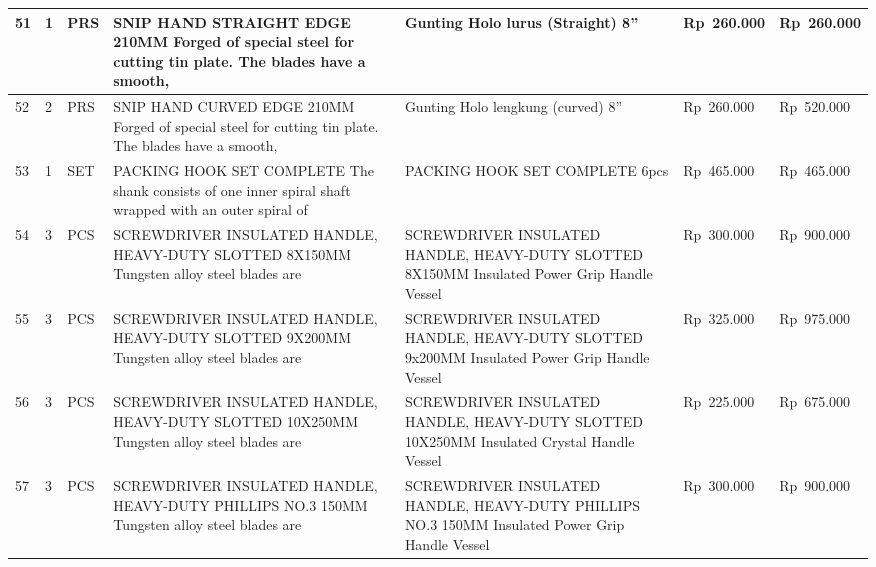 \documentclass[9pt,a4paper,landscape]{article}
\begin{document}
\begin{longtable}{|C{0.6cm}|C{0.6cm}|C{0.8cm}|L{8.0cm}|L{9.5cm}|R{2.5cm}|R{2.5cm}|}
51 & 1 & PRS &
  SNIP HAND STRAIGHT EDGE 210MM\newline
  Forged of special steel for cutting tin plate.\newline
  The blades have a smooth, &
  Gunting Holo lurus (Straight) 8'' &
  Rp~260.000 & Rp~260.000 \\
\hline

52 & 2 & PRS &
  SNIP HAND CURVED EDGE 210MM\newline
  Forged of special steel for cutting tin plate.\newline
  The blades have a smooth, &
  Gunting Holo lengkung (curved) 8'' &
  Rp~260.000 & Rp~520.000 \\
\hline

53 & 1 & SET &
  PACKING HOOK SET COMPLETE\newline
  The shank consists of one inner spiral shaft\newline
  wrapped with an outer spiral of &
  PACKING HOOK SET COMPLETE 6pcs &
  Rp~465.000 & Rp~465.000 \\
\hline

54 & 3 & PCS &
  SCREWDRIVER INSULATED HANDLE, HEAVY-DUTY\newline
  SLOTTED 8X150MM Tungsten alloy steel blades are &
  SCREWDRIVER INSULATED HANDLE, HEAVY-DUTY SLOTTED\newline
  8X150MM Insulated Power Grip Handle Vessel &
  Rp~300.000 & Rp~900.000 \\
\hline

55 & 3 & PCS &
  SCREWDRIVER INSULATED HANDLE, HEAVY-DUTY\newline
  SLOTTED 9X200MM Tungsten alloy steel blades are &
  SCREWDRIVER INSULATED HANDLE, HEAVY-DUTY SLOTTED\newline
  9x200MM Insulated Power Grip Handle Vessel &
  Rp~325.000 & Rp~975.000 \\
\hline

56 & 3 & PCS &
  SCREWDRIVER INSULATED HANDLE, HEAVY-DUTY\newline
  SLOTTED 10X250MM Tungsten alloy steel blades are &
  SCREWDRIVER INSULATED HANDLE, HEAVY-DUTY SLOTTED\newline
  10X250MM Insulated Crystal Handle Vessel &
  Rp~225.000 & Rp~675.000 \\
\hline

57 & 3 & PCS &
  SCREWDRIVER INSULATED HANDLE, HEAVY-DUTY\newline
  PHILLIPS NO.3 150MM Tungsten alloy steel blades are &
  SCREWDRIVER INSULATED HANDLE, HEAVY-DUTY PHILLIPS NO.3\newline
  150MM Insulated Power Grip Handle Vessel &
  Rp~300.000 & Rp~900.000 \\
\hline


\end{longtable}
\end{document}
